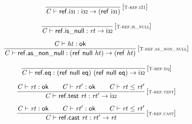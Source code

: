 $$
\begin{array}{@{}c@{}}\displaystyle
\frac{
}{
{\mathit{C}} \vdash \mathsf{ref.i{\scriptstyle31}} : \mathsf{i{\scriptstyle32}} \rightarrow (\mathsf{ref}~\mathsf{i{\scriptstyle31}})
} \, {[\textsc{\scriptsize T{-}ref.i31}]}
\qquad
\end{array}
$$

$$
\begin{array}{@{}c@{}}\displaystyle
\frac{
}{
{\mathit{C}} \vdash \mathsf{ref.is\_null} : {\mathit{rt}} \rightarrow \mathsf{i{\scriptstyle32}}
} \, {[\textsc{\scriptsize T{-}ref.is\_null}]}
\qquad
\end{array}
$$

$$
\begin{array}{@{}c@{}}\displaystyle
\frac{
{\mathit{C}} \vdash {\mathit{ht}} : \mathsf{ok}
}{
{\mathit{C}} \vdash \mathsf{ref.as\_non\_null} : (\mathsf{ref}~\mathsf{null}~{\mathit{ht}}) \rightarrow (\mathsf{ref}~{\mathit{ht}})
} \, {[\textsc{\scriptsize T{-}ref.as\_non\_null}]}
\qquad
\end{array}
$$

$$
\begin{array}{@{}c@{}}\displaystyle
\frac{
}{
{\mathit{C}} \vdash \mathsf{ref.eq} : (\mathsf{ref}~\mathsf{null}~\mathsf{eq})~(\mathsf{ref}~\mathsf{null}~\mathsf{eq}) \rightarrow \mathsf{i{\scriptstyle32}}
} \, {[\textsc{\scriptsize T{-}ref.eq}]}
\qquad
\end{array}
$$

$$
\begin{array}{@{}c@{}}\displaystyle
\frac{
{\mathit{C}} \vdash {\mathit{rt}} : \mathsf{ok}
 \qquad
{\mathit{C}} \vdash {\mathit{rt}'} : \mathsf{ok}
 \qquad
{\mathit{C}} \vdash {\mathit{rt}} \leq {\mathit{rt}'}
}{
{\mathit{C}} \vdash \mathsf{ref.test}~{\mathit{rt}} : {\mathit{rt}'} \rightarrow \mathsf{i{\scriptstyle32}}
} \, {[\textsc{\scriptsize T{-}ref.test}]}
\qquad
\end{array}
$$

$$
\begin{array}{@{}c@{}}\displaystyle
\frac{
{\mathit{C}} \vdash {\mathit{rt}} : \mathsf{ok}
 \qquad
{\mathit{C}} \vdash {\mathit{rt}'} : \mathsf{ok}
 \qquad
{\mathit{C}} \vdash {\mathit{rt}} \leq {\mathit{rt}'}
}{
{\mathit{C}} \vdash \mathsf{ref.cast}~{\mathit{rt}} : {\mathit{rt}'} \rightarrow {\mathit{rt}}
} \, {[\textsc{\scriptsize T{-}ref.cast}]}
\qquad
\end{array}
$$

\vspace{1ex}

